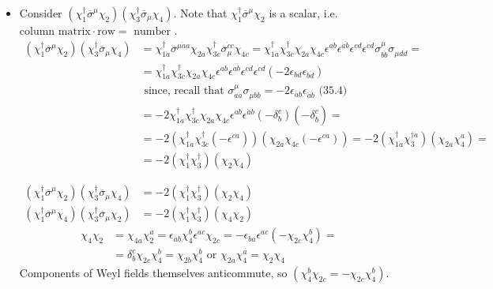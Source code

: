 \documentclass[twoside]{amsart}
\newcommand{\solutionhead}[1]
  {\smallskip
   \noindent{\large\bf Solution #1.}
   }
\begin{document}
\solutionhead{36.3} \begin{itemize}
\item[(a)] Consider $(\chi^{\dag}_1 \overline{\sigma}^{\mu} \chi_2)(\chi_3^{\dag} \overline{\sigma}_{\mu} \chi_4)$.  Note that $\chi_1^{\dag} \overline{\sigma}^{\mu} \chi_2$ is a scalar, i.e. $\text{column matrix} \cdot \text{row} = \text{ number }$.  
\[
\begin{aligned}
	(\chi^{\dag}_1 \overline{\sigma}^{\mu} \chi_2)(\chi_3^{\dag} \overline{\sigma}_{\mu} \chi_4) & 	= \chi_{1\dot{a}}^{\dag} \overline{\sigma}^{\mu \dot{a} a} \chi_{2a} \chi^{\dag}_{3\dot{c}} \overline{\sigma}_{\mu}^{\dot{c} c} \chi_{4c} = \chi_{1\dot{a}}^{\dag} \chi_{3\dot{c}}^{\dag} \chi_{2a} \chi_{4c} \epsilon^{ab} \epsilon^{\dot{a}\dot{b}} \epsilon^{cd} \epsilon^{\dot{c} \dot{d}} \sigma^{\mu}_{b\dot{b}} \sigma_{\mu d \dot{d}} = \\
	& = \chi_{1\dot{a}}^{\dag} \chi_{3\dot{c}}^{\dag} \chi_{2a} \chi_{4c} \epsilon^{ab} \epsilon^{\dot{a} \dot{b}} \epsilon^{cd} \epsilon^{\dot{c} \dot{d}} (-2\epsilon_{bd} \epsilon_{\dot{b} \dot{d}} )  \\
		& \text{ since, recall that $\sigma_{a\dot{a}}^{\mu} \sigma_{\mu b\dot{b}} = -2 \epsilon_{ab} \epsilon_{\dot{a} \dot{b}}$  (35.4) } \\ 
			& = -2 \chi_{1\dot{a}}^{\dag} \chi_{3\dot{c}}^{\dag} \chi_{2a} \chi_{4c} \epsilon^{ab} \epsilon^{\dot{a} \dot{b}} (-\delta_b^c )(-\delta_{\dot{b}}^{\dot{c}}) = \\
				& = -2(\chi_{1\dot{a}}^{\dag} \chi_{3\dot{c}}^{\dag} (- \epsilon^{\dot{c} \dot{a}} ) )(\chi_{2a} \chi_{4c} (-\epsilon^{ca}) ) = -2(\chi_{1\dot{a}}^{\dag} \chi_3^{\dag \dot{a}} )( \chi_{2a} \chi_4^a ) = \\
					& = -2 (\chi_1^{\dag} \chi_3^{\dag} )(\chi_2 \chi_4)  
\end{aligned}
\]


$\begin{aligned} (\chi_1^{\dag} \overline{\sigma}^{\mu} \chi_2)(\chi_3^{\dag} \overline{\sigma}_{\mu} \chi_4) & = -2 (\chi_1^{\dag} \chi_3^{\dag} )(\chi_2 \chi_4) \\ (\chi_1^{\dag} \overline{\sigma}^{\mu} \chi_4)(\chi_3^{\dag} \overline{\sigma}_{\mu} \chi_2) & = -2 (\chi_1^{\dag} \chi_3^{\dag} )(\chi_4 \chi_2) \end{aligned}$
\[
\begin{aligned}
	\chi_4 \chi_2 & = \chi_{4a} \chi_2^a = \epsilon_{ab} \chi_4^b \epsilon^{ac} \chi_{2c} = -\epsilon_{ba} \epsilon^{ac} ( - \chi_{2c} \chi_4^b ) = \\
		& = \delta_b^c \chi_{2c} \chi_4^b = \chi_{2b} \chi_4^b \text{ or } \chi_{2a} \chi_4^a = \chi_2 \chi_4
\end{aligned}
\]
Components of Weyl fields themselves anticommute, so $(\chi_4^b \chi_{2c} = - \chi_{2c} \chi_4^b)$.  


\end{itemize}
\end{document}
